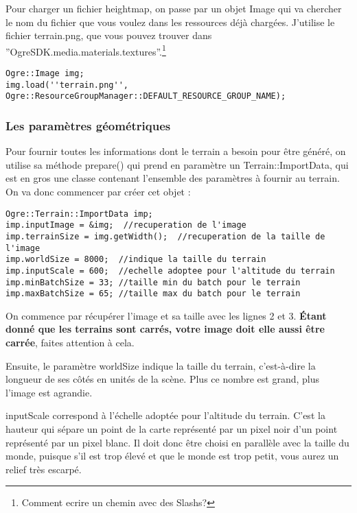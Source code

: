 Pour charger un fichier heightmap, on passe par un objet Image qui va chercher le nom du fichier que vous voulez dans les ressources d\'ej\`a charg\'ees. J'utilise le fichier terrain.png, que vous pouvez trouver dans ''OgreSDK.media.materials.textures''.\footnote{Comment ecrire un chemin avec des Slashs?}

\begin{lstlisting}[caption={Chargement du fichier heightmap}]
Ogre::Image img;
img.load(''terrain.png'', Ogre::ResourceGroupManager::DEFAULT_RESOURCE_GROUP_NAME);
\end{lstlisting}






\subsubsection{Les param\`etres g\'eom\'etriques}


Pour fournir toutes les informations dont le terrain a besoin pour \^etre g\'en\'er\'e, on utilise sa m\'ethode prepare() qui prend en param\`etre un Terrain::ImportData, qui est en gros une classe contenant l'ensemble des param\`etres \`a fournir au terrain. On va donc commencer par cr\'eer cet objet :

\begin{lstlisting}[caption={Cr\'eation de l'objet ImportData pour la d\'efinition des param\`etres \`a fournir au terrain}]
Ogre::Terrain::ImportData imp;
imp.inputImage = &img;  //recuperation de l'image
imp.terrainSize = img.getWidth();  //recuperation de la taille de l'image
imp.worldSize = 8000;  //indique la taille du terrain
imp.inputScale = 600;  //echelle adoptee pour l'altitude du terrain
imp.minBatchSize = 33; //taille min du batch pour le terrain
imp.maxBatchSize = 65; //taille max du batch pour le terrain
\end{lstlisting}

On commence par r\'ecup\'erer l'image et sa taille avec les lignes 2 et 3. \textbf{\'Etant donn\'e que les terrains sont carr\'es, votre image doit elle aussi \^etre carr\'ee}, faites attention \`a cela.

Ensuite, le param\`etre worldSize indique la taille du terrain, c'est-\`a-dire la longueur de ses c\^ot\'es en unit\'es de la sc\`ene. Plus ce nombre est grand, plus l'image est agrandie.

inputScale correspond \`a l'\'echelle adopt\'ee pour l'altitude du terrain. C'est la hauteur qui s\'epare un point de la carte repr\'esent\'e par un pixel noir d'un point repr\'esent\'e par un pixel blanc. Il doit donc \^etre choisi en parall\`ele avec la taille du monde, puisque s'il est trop \'elev\'e et que le monde est trop petit, vous aurez un relief tr\`es escarp\'e.

